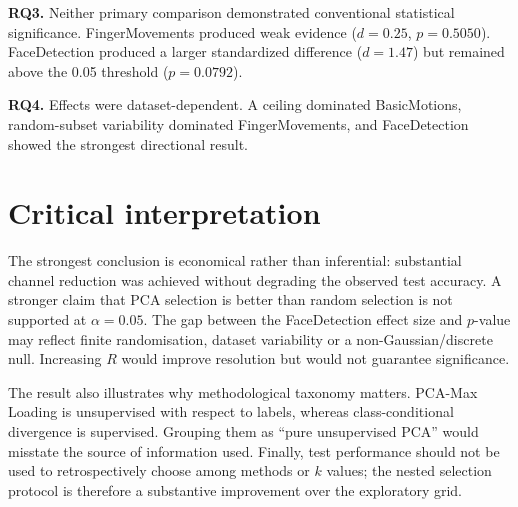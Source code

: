 \textbf{RQ3.} Neither primary comparison demonstrated conventional statistical significance. FingerMovements produced weak evidence ($d=0.25$, $p=0.5050$). FaceDetection produced a larger standardized difference ($d=1.47$) but remained above the 0.05 threshold ($p=0.0792$).

\textbf{RQ4.} Effects were dataset-dependent. A ceiling dominated BasicMotions, random-subset variability dominated FingerMovements, and FaceDetection showed the strongest directional result.

\section{Critical interpretation}
The strongest conclusion is economical rather than inferential: substantial channel reduction was achieved without degrading the observed test accuracy. A stronger claim that PCA selection is better than random selection is not supported at $\alpha=0.05$. The gap between the FaceDetection effect size and $p$-value may reflect finite randomisation, dataset variability or a non-Gaussian/discrete null. Increasing $R$ would improve resolution but would not guarantee significance.

The result also illustrates why methodological taxonomy matters. PCA-Max Loading is unsupervised with respect to labels, whereas class-conditional divergence is supervised. Grouping them as ``pure unsupervised PCA'' would misstate the source of information used. Finally, test performance should not be used to retrospectively choose among methods or $k$ values; the nested selection protocol is therefore a substantive improvement over the exploratory grid.

